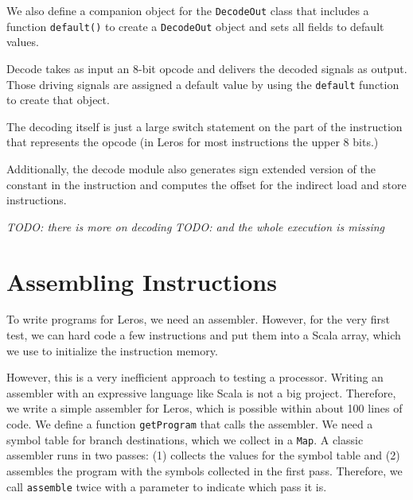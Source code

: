\documentclass[%
    10pt,
    headinclude, footinclude=false,
    openright, %
    notitlepage,
    cleardoublepage=empty,
    headsepline,
    numbers=noenddot,
    bibliography=totoc, index=totoc,
    ]{scrbook}
\newcommand{\code}[1]{{\lstinline[basicstyle=\small\ttfamily]{#1}}}
\newcommand{\todo}[1]{{\emph{TODO: #1}}}
\begin{document}

\noindent We also define a companion object for the \code{DecodeOut} class that includes a
function \code{default()} to create a \code{DecodeOut} object and sets all fields to
default values.
 

\noindent Decode takes as input an 8-bit opcode and delivers the decoded signals
as output. Those driving signals are assigned a default value by using the \code{default}
function to create that object.


\noindent The decoding itself is just a large switch statement on the part of the
instruction that represents the opcode (in Leros for most instructions the upper
8 bits.)


Additionally, the decode module also generates sign extended version of the
constant in the instruction and computes the offset for the indirect load and
store instructions.

\todo{there is more on decoding}
\todo{and the whole execution is missing}

\section{Assembling Instructions}


To write programs for Leros, we need an assembler. However, for the very first
test, we can hard code a few instructions and put them into a Scala array,
which we use to initialize the instruction memory.


\noindent However, this is a very inefficient approach to testing a processor.
Writing an assembler with an expressive language like Scala is not a big project.
Therefore, we write a simple assembler for Leros, which is possible within about
100 lines of code. We define a function \code{getProgram} that calls the assembler.
We need a symbol table for branch destinations, which we collect in a \code{Map}.
A classic assembler runs in two passes: (1) collects the values for the symbol table
and (2) assembles the program with the symbols collected in the first pass.
Therefore, we call \code{assemble} twice with a parameter to indicate which pass it is.
\end{document}
